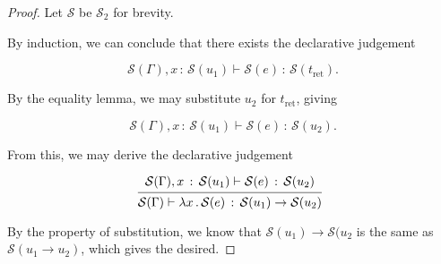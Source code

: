 \documentclass{article}
\newcommand{\G}{\Gamma}
\newcommand{\St}{\mathcal{S}}
\newcommand{\tret}{t_{\text{ret}}}
\newcommand{\uv}{u}
\newcommand{\e}{e}
\newcommand{\x}{x}
\newcommand{\withtp}[2]{{#1} \,:\, {#2}}
\newcommand{\lam}[2]{\lambda {#1} \,.\, {#2}}
\newcommand{\arr}[2]{{#1} \to {#2}}
\newcommand{\hastp}[3]{#1 \vdash {\withtp {#2} {#3}}}
\newcommand{\deduct}[3][]
{
  \begin{prooftree}
    \hypo{#2}
    \infer1[\text{#1}]{#3}
  \end{prooftree}
}
\begin{document}
\begin{proof}
  Let \(\St\) be \(\St_2\) for brevity.

  By induction, we can conclude that there exists the declarative judgement

  \[ \hastp {\St(\G), \withtp \x {\St(\uv_1)}} {\St(\e)} {\St(\tret)}.\]

  By the equality lemma, we may substitute \(\uv_2\) for \(\tret\), giving

  \[ \hastp {\St(\G), \withtp \x {\St(\uv_1)}} {\St(\e)} {\St(\uv_2)}.\]

  From this, we may derive the declarative judgement

  \[
    \deduct
    {\hastp {\St(\G), \withtp \x {\St(\uv_1)}} {\St(\e)} {\St(\uv_2)}}
    {\hastp {\St(\G)} {\lam \x {\St(\e)}} {\arr {\St(\uv_1)} {\St(\uv_2)}}}
  \]
  
  By the property of substitution, we know that \({\arr {\St(\uv_1)}
  {\St(\uv_2}}\) is the same as \(\St(\arr {\uv_1} {\uv_2})\), which gives
  the desired.

\end{proof}
\end{document}

